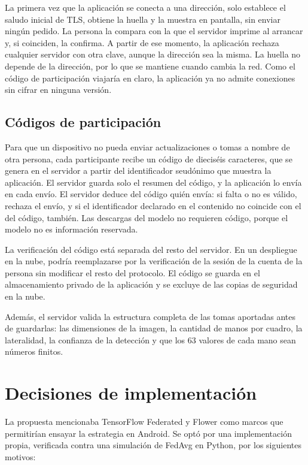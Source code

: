 La primera vez que la aplicación se conecta a una dirección, solo establece el saludo inicial de TLS, obtiene la huella y la muestra en pantalla, sin enviar ningún pedido. La persona la compara con la que el servidor imprime al arrancar y, si coinciden, la confirma. A partir de ese momento, la aplicación rechaza cualquier servidor con otra clave, aunque la dirección sea la misma. La huella no depende de la dirección, por lo que se mantiene cuando cambia la red. Como el código de participación viajaría en claro, la aplicación ya no admite conexiones sin cifrar en ninguna versión.

\subsection{Códigos de participación}

Para que un dispositivo no pueda enviar actualizaciones o tomas a nombre de otra persona, cada participante recibe un código de dieciséis caracteres, que se genera en el servidor a partir del identificador seudónimo que muestra la aplicación. El servidor guarda solo el resumen del código, y la aplicación lo envía en cada envío. El servidor deduce del código quién envía: si falta o no es válido, rechaza el envío, y si el identificador declarado en el contenido no coincide con el del código, también. Las descargas del modelo no requieren código, porque el modelo no es información reservada.

La verificación del código está separada del resto del servidor. En un despliegue en la nube, podría reemplazarse por la verificación de la sesión de la cuenta de la persona sin modificar el resto del protocolo. El código se guarda en el almacenamiento privado de la aplicación y se excluye de las copias de seguridad en la nube.

Además, el servidor valida la estructura completa de las tomas aportadas antes de guardarlas: las dimensiones de la imagen, la cantidad de manos por cuadro, la lateralidad, la confianza de la detección y que los 63 valores de cada mano sean números finitos.

\section{Decisiones de implementación}

La propuesta mencionaba TensorFlow Federated y Flower como marcos que permitirían ensayar la estrategia en Android. Se optó por una implementación propia, verificada contra una simulación de FedAvg en Python, por los siguientes motivos:


